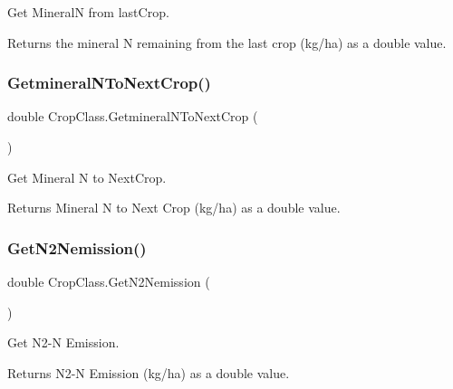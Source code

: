 Get MineralN from last\+Crop. 

\begin{DoxyReturn}{Returns}
the mineral N remaining from the last crop (kg/ha) as a double value. 
\end{DoxyReturn}
\mbox{\label{class_crop_class_a52a59935e6b699010f0fa503b8d2237d}} 
\subsubsection{\texorpdfstring{GetmineralNToNextCrop()}{GetmineralNToNextCrop()}}
{\footnotesize\ttfamily double Crop\+Class.\+Getmineral\+N\+To\+Next\+Crop (\begin{DoxyParamCaption}{ }\end{DoxyParamCaption})\hspace{0.3cm}{\ttfamily [inline]}}



Get Mineral N to Next\+Crop. 

\begin{DoxyReturn}{Returns}
Mineral N to Next Crop (kg/ha) as a double value. 
\end{DoxyReturn}
\mbox{\label{class_crop_class_a81108483d7d4f5e48405a58e07618c14}} 
\subsubsection{\texorpdfstring{GetN2Nemission()}{GetN2Nemission()}}
{\footnotesize\ttfamily double Crop\+Class.\+Get\+N2\+Nemission (\begin{DoxyParamCaption}{ }\end{DoxyParamCaption})\hspace{0.3cm}{\ttfamily [inline]}}



Get N2-\/N Emission. 

\begin{DoxyReturn}{Returns}
N2-\/N Emission (kg/ha) as a double value. 
\end{DoxyReturn}
\mbox{\label{class_crop_class_ae582dbc59eafb0c86af12ae7ee7d5c8f}} 
